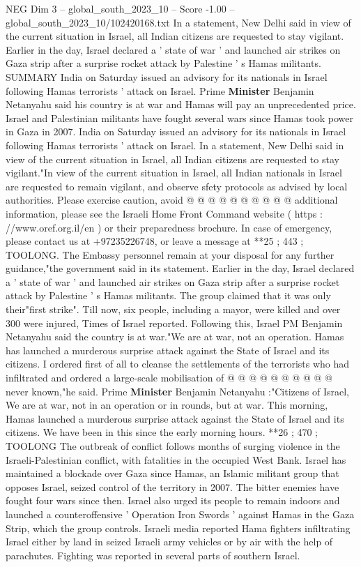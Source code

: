 \begin{textsample}{NEG Dim 3 – global\_south\_2023\_10 – Score -1.00 – global\_south\_2023\_10/102420168.txt}  \label{ex:f3_neg_026}
In a statement, New Delhi said in view of the current situation in Israel, all Indian citizens are requested to stay vigilant.
Earlier in the day, Israel declared a ' state of war ' and launched air strikes on Gaza strip after a surprise rocket attack by Palestine ' s Hamas militants.
SUMMARY India on Saturday issued an advisory for its nationals in Israel following Hamas terrorists ' attack on Israel.
Prime \textbf{Minister} Benjamin Netanyahu said his country is at war and Hamas will pay an unprecedented price.
Israel and Palestinian militants have fought several wars since Hamas took power in Gaza in 2007.
India on Saturday issued an advisory for its nationals in Israel following Hamas terrorists ' attack on Israel.
In a statement, New Delhi said in view of the current situation in Israel, all Indian citizens are requested to stay vigilant."In view of the current situation in Israel, all Indian nationals in Israel are requested to remain vigilant, and observe sfety protocols as advised by local authorities.
Please exercise caution, avoid @ @ @ @ @ @ @ @ @ @ additional information, please see the Israeli Home Front Command website ( https : //www.oref.org.il/en ) or their preparedness brochure.
In case of emergency, please contact us at +97235226748, or leave a message at **25 ; 443 ; TOOLONG.
The Embassy personnel remain at your disposal for any further guidance,"the government said in its statement.
Earlier in the day, Israel declared a ' state of war ' and launched air strikes on Gaza strip after a surprise rocket attack by Palestine ' s Hamas militants.
The group claimed that it was only their"first strike".
Till now, six people, including a mayor, were killed and over 300 were injured, Times of Israel reported.
Following this, Israel PM Benjamin Netanyahu said the country is at war."We are at war, not an operation.
Hamas has launched a murderous surprise attack against the State of Israel and its citizens.
I ordered first of all to cleanse the settlements of the terrorists who had infiltrated and ordered a large-scale mobilisation of @ @ @ @ @ @ @ @ @ @ never known,"he said.
Prime \textbf{Minister} Benjamin Netanyahu :"Citizens of Israel, We are at war, not in an operation or in rounds, but at war.
This morning, Hamas launched a murderous surprise attack against the State of Israel and its citizens.
We have been in this since the early morning hours. **26 ; 470 ; TOOLONG The outbreak of conflict follows months of surging violence in the Israeli-Palestinian conflict, with fatalities in the occupied West Bank.
Israel has maintained a blockade over Gaza since Hamas, an Islamic militant group that opposes Israel, seized control of the territory in 2007.
The bitter enemies have fought four wars since then.
Israel also urged its people to remain indoors and launched a counteroffensive ' Operation Iron Swords ' against Hamas in the Gaza Strip, which the group controls.
Israeli media reported Hama fighters infiltrating Israel either by land in seized Israeli army vehicles or by air with the help of parachutes.
Fighting was reported in several parts of southern Israel.

\end{textsample}
